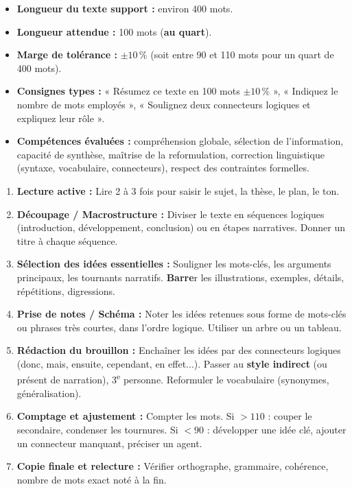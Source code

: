 \documentclass[11pt]{article}
\newcommand{\cle}[1]{{\popxbold\color{popdark}#1}}
\begin{document}
\begin{aretenir}
\begin{itemize}
\item \textbf{Longueur du texte support :} environ 400 mots.
\item \textbf{Longueur attendue :} 100 mots (\textbf{au quart}).
\item \textbf{Marge de tolérance :} $\pm 10\,\%$ (soit entre 90 et 110 mots pour un quart de 400 mots).
\item \textbf{Consignes types :} « Résumez ce texte en 100 mots $\pm 10\,\%$ », « Indiquez le nombre de mots employés », « Soulignez deux connecteurs logiques et expliquez leur rôle ».
\item \textbf{Compétences évaluées :} compréhension globale, sélection de l'information, capacité de synthèse, maîtrise de la reformulation, correction linguistique (syntaxe, vocabulaire, connecteurs), respect des contraintes formelles.
\end{itemize}
\end{aretenir}

\begin{methode}
\begin{enumerate}
\item \textbf{Lecture active :} Lire 2 à 3 fois pour saisir le sujet, la thèse, le plan, le ton.
\item \textbf{Découpage / Macrostructure :} Diviser le texte en séquences logiques (introduction, développement, conclusion) ou en étapes narratives. Donner un titre à chaque séquence.
\item \textbf{Sélection des idées essentielles :} Souligner les mots-clés, les arguments principaux, les tournants narratifs. \textbf{Barre}r les illustrations, exemples, détails, répétitions, digressions.
\item \textbf{Prise de notes / Schéma :} Noter les idées retenues sous forme de mots-clés ou phrases très courtes, dans l'ordre logique. Utiliser un arbre ou un tableau.
\item \textbf{Rédaction du brouillon :} Enchaîner les idées par des \cle{connecteurs logiques} (donc, mais, ensuite, cependant, en effet...). Passer au \textbf{style indirect} (ou présent de narration), 3\textsuperscript{e} personne. Reformuler le vocabulaire (synonymes, généralisation).
\item \textbf{Comptage et ajustement :} Compter les mots. Si $> 110$ : couper le secondaire, condenser les tournures. Si $< 90$ : développer une idée clé, ajouter un connecteur manquant, préciser un agent.
\item \textbf{Copie finale et relecture :} Vérifier orthographe, grammaire, cohérence, nombre de mots exact noté à la fin.
\end{enumerate}
\end{methode}
\end{document}
